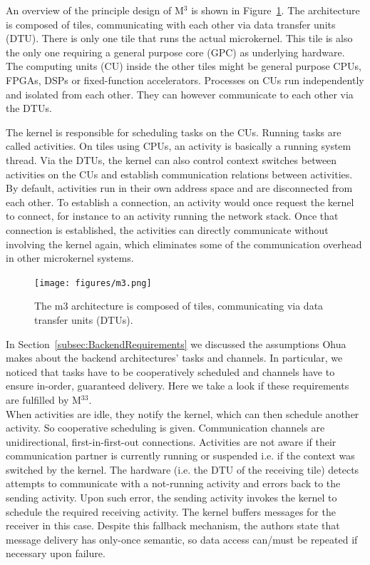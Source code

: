 An overview of the principle design of M$^3$ is shown in Figure~\ref{fig:m3}. The architecture is composed of tiles, communicating with each other via data transfer units (DTU). There is only one tile that runs the actual microkernel. This tile is also the only one requiring a general purpose core (GPC) as underlying hardware. The computing units (CU) inside the other tiles might be general purpose CPUs, FPGAs, DSPs or fixed-function accelerators. Processes on CUs run independently and isolated from each other. They can however communicate to each other via the DTUs.

The kernel is responsible for scheduling tasks on the CUs. Running tasks are called activities. On tiles using CPUs, an activity is basically a running system thread. Via the DTUs, the kernel can also control context switches between activities on the CUs and establish communication relations between activities. By default, activities run in their own address space and are disconnected from each other. To establish a connection, an activity  would once request the kernel to connect, for instance to an activity  running the network stack. Once that connection is established, the activities can directly communicate without involving the kernel again, which eliminates some of the communication overhead in other microkernel systems. 

\begin{figure}[H]
    \centering
    \texttt{[image: figures/m3.png]}
    \caption{The m3 architecture is composed of tiles, communicating via data transfer units (DTUs).}
    \label{fig:m3}
\end{figure}

In Section~\ref{subsec:BackendRequirements} we discussed the assumptions Ohua makes about the backend architectures' tasks and channels. In particular, we noticed that tasks have to be cooperatively scheduled and channels have to ensure in-order, guaranteed delivery. Here we take a look if these requirements are fulfilled by M$^33$.\\

When activities are idle, they notify the kernel, which can then schedule another activity. So cooperative scheduling is given. Communication channels are unidirectional, first-in-first-out connections. Activities are not aware if their communication partner is currently running or suspended i.e. if the context was switched by the kernel. The hardware (i.e. the DTU of the receiving tile) detects attempts to communicate with a not-running activity and errors back to the sending activity. Upon such error, the sending activity invokes the kernel to schedule the required receiving activity. The kernel buffers messages for the receiver in this case. Despite this fallback mechanism, the authors state that message delivery has only-once semantic, so data access can/must be repeated if necessary upon failure. 

